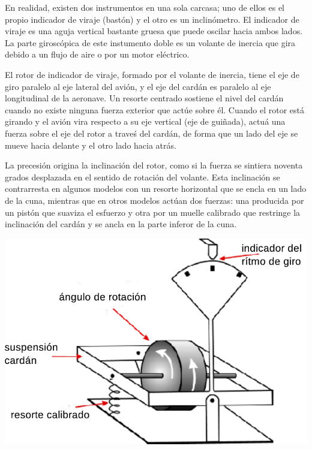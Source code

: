 \documentclass{article}
\begin{document}
En realidad, existen dos instrumentos en una sola carcasa; uno de ellos es el propio indicador de viraje (bastón)  y el otro es un inclinómetro.
El indicador de viraje es una aguja vertical bastante gruesa que puede oscilar hacia ambos lados. La parte giroscópica de este instumento doble es un volante de inercia que gira debido a un flujo de aire o por un motor eléctrico.

El rotor de indicador de viraje, formado por el volante de inercia, tiene el eje de giro paralelo al eje lateral del avión, y el eje del cardán es paralelo al eje longitudinal de la aeronave. Un resorte centrado sostiene el nivel del cardán cuando no existe ninguna fuerza exterior que actúe sobre él. Cuando el rotor está girando y el avión vira respecto a su eje vertical (eje de guiñada), actuá una fuerza sobre el eje del rotor a traveś del cardán, de forma que un lado del eje se mueve hacia delante y el otro lado hacia atrás.

La precesión origina la inclinación del rotor, como si la fuerza se sintiera noventa grados desplazada en el sentido de rotación del volante. Esta inclinación se contrarresta en algunos modelos con un resorte horizontal que se encla en un lado de la cuna, mientras que en otros modelos actúan dos fuerzas: una producida por un pistón que suaviza el esfuerzo y otra por un muelle calibrado que restringe la inclinación del cardán y se ancla en la parte inferor de la cuna.
\begin{center}
\includegraphics[scale=0.6]{figuras/turnandslip-spring.pdf}
\label{fig:presecion}
\end{center}
\end{document}
